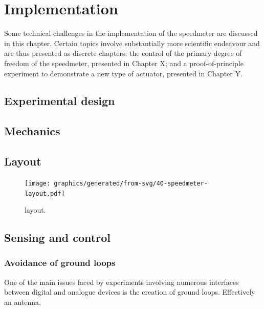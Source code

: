 \section{Implementation}

Some technical challenges in the implementation of the speedmeter are discussed in this chapter. Certain topics involve substantially more scientific endeavour and are thus presented as discrete chapters: the control of the primary degree of freedom of the speedmeter, presented in Chapter X; and a proof-of-principle experiment to demonstrate a new type of actuator, presented in Chapter Y.

\subsection{Experimental design}

\subsection{Mechanics}

\subsection{Layout}

\begin{figure}
  \centering
  \texttt{[image: graphics/generated/from-svg/40-speedmeter-layout.pdf]}
  \caption[\SSMEXPT{} layout]{\label{fig:ssm-layout}\SSMEXPT{} layout.}
\end{figure}

\subsection{Sensing and control}

\subsubsection{Avoidance of ground loops}

One of the main issues faced by experiments involving numerous interfaces between digital and analogue devices is the creation of ground loops. Effectively an antenna.


